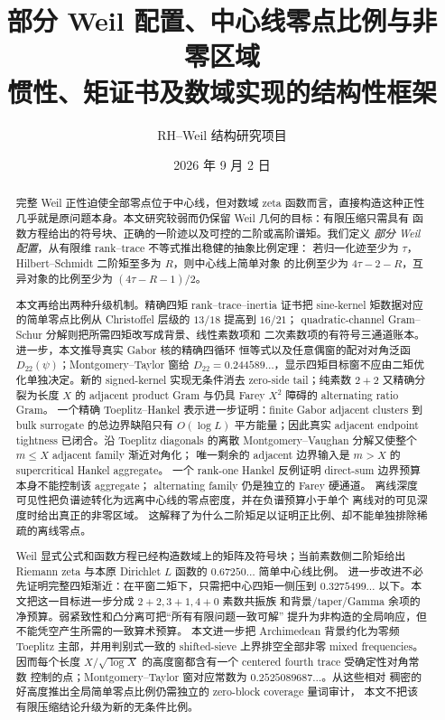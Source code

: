 \documentclass[UTF8,11pt,a4paper]{ctexart}
\title{部分 Weil 配置、中心线零点比例与非零区域\\
\large 惯性、矩证书及数域实现的结构性框架}
\author{RH--Weil 结构研究项目}
\date{2026 年 9 月 2 日}
\theoremstyle{definition}
\theoremstyle{remark}
\begin{document}
\maketitle

\begin{abstract}
完整 Weil 正性迫使全部零点位于中心线，但对数域 zeta 函数而言，直接构造这种正性
几乎就是原问题本身。本文研究较弱而仍保留 Weil 几何的目标：有限压缩只需具有
函数方程给出的符号块、正确的一阶迹以及可控的二阶或高阶谱矩。我们定义
\emph{部分 Weil 配置}，从有限维 rank--trace 不等式推出稳健的抽象比例定理：
若归一化迹至少为 $\tau$，Hilbert--Schmidt 二阶矩至多为 $R$，则中心线上简单对象
的比例至少为 $4\tau-2-R$，互异对象的比例至少为 $(4\tau-R-1)/2$。

本文再给出两种升级机制。精确四矩 rank--trace--inertia 证书把 sine-kernel
矩数据对应的简单零点比例从 Christoffel 层级的 $13/18$ 提高到 $16/21$；
quadratic-channel Gram--Schur 分解则把所需四矩改写成背景、线性素数项和
二次素数项的有符号三通道账本。进一步，本文推导真实 Gabor 核的精确四循环
恒等式以及任意偶窗的配对对角泛函 $D_{22}(\psi)$；Montgomery--Taylor 窗给
$D_{22}=0.244589\ldots$，显示四矩目标窗不应由二矩优化单独决定。新的
signed-kernel 实现无条件消去 zero-side tail；纯素数 $2+2$ 又精确分裂为长度
$X$ 的 adjacent product Gram 与仍具 Farey $X^2$ 障碍的 alternating ratio Gram。
一个精确 Toeplitz--Hankel 表示进一步证明：finite Gabor adjacent clusters
到 bulk surrogate 的总边界缺陷只有 $O(\log L)$ 平方能量；因此真实 adjacent
endpoint tightness 已闭合。沿 Toeplitz diagonals 的离散
Montgomery--Vaughan 分解又使整个 $m\le X$ adjacent family 渐近对角化；
唯一剩余的 adjacent 边界输入是 $m>X$ 的 supercritical Hankel aggregate。
一个 rank-one Hankel 反例证明 direct-sum 边界预算本身不能控制该 aggregate；
alternating family 仍是独立的 Farey 硬通道。
离线深度可见性把负谱迹转化为远离中心线的零点密度，并在负谱预算小于单个
离线对的可见深度时给出真正的非零区域。
这解释了为什么二阶矩足以证明正比例、却不能单独排除稀疏的离线零点。

Weil 显式公式和函数方程已经构造数域上的矩阵及符号块；当前素数侧二阶矩给出
Riemann zeta 与本原 Dirichlet $L$ 函数的 $0.67250\ldots$ 简单中心线比例。
进一步改进不必先证明完整四矩渐近：在平窗二矩下，只需把中心四矩一侧压到
$0.3275499\ldots$ 以下。本文把这一目标进一步分成 $2+2,3+1,4+0$ 素数共振族
和背景/taper/Gamma 余项的净预算。弱紧致性和凸分离可把“所有有限问题一致可解”
提升为非构造的全局响应，但不能凭空产生所需的一致算术预算。
本文进一步把 Archimedean 背景约化为零频 Toeplitz 主部，并用判别式一致的
shifted-sieve 上界排空全部非零 mixed frequencies。因而每个长度
$X/\sqrt{\log X}$ 的高度窗都含有一个 centered fourth trace 受确定性对角常数
控制的点；Montgomery--Taylor 窗对应常数为 $0.2525089687\ldots$。从这些相对
稠密的好高度推出全局简单零点比例仍需独立的 zero-block coverage 量词审计，
本文不把该有限压缩结论升级为新的无条件比例。
\end{abstract}
\end{document}
